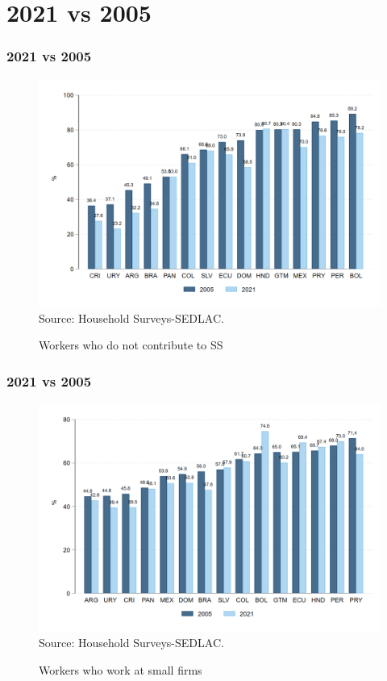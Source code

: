 \documentclass{beamer}
\begin{document}
\section{2021 vs 2005}


\begin{frame}
\frametitle{2021 vs 2005}
\begin{figure}[!htb]
    \justifying
     \caption{Workers who do not contribute to SS}     
     \includegraphics[width=0.8\linewidth]{latex/figures/Snapshot/snapshot_informal_ss.png}
    \label{fig:SalariedSS}
    \centering
    \footnotesize{Source: Household Surveys-SEDLAC.}
\end{figure}
    
\end{frame}


\begin{frame}
\frametitle{2021 vs 2005}
\begin{figure}[!htb]
    \justifying
     \caption{Workers who work at small firms}     
     \includegraphics[width=0.8\linewidth]{latex/figures/Snapshot/snapshot_workers_small.png}
    \label{fig:SalariedSmall}
    \centering
    \footnotesize{Source: Household Surveys-SEDLAC.}
\end{figure}
\end{frame}
\end{document}
